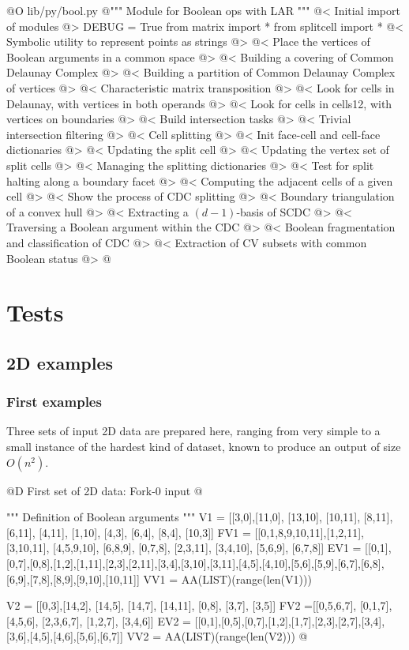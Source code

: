 \documentclass[11pt,oneside]{article}	%
\begin{document}
@O lib/py/bool.py
@{""" Module for Boolean ops with LAR """
@< Initial import of modules @>
DEBUG = True
from matrix import *
from splitcell import *
@< Symbolic utility to represent points as strings @>
@< Place the vertices of Boolean arguments in a common space @>
@< Building a covering of Common Delaunay Complex @>
@< Building a partition of Common Delaunay Complex of vertices @>
@< Characteristic matrix transposition @>
@< Look for cells in Delaunay, with vertices in both operands @>
@< Look for cells in cells12, with vertices on boundaries @>
@< Build intersection tasks @>
@< Trivial intersection filtering @>
@< Cell splitting @>
@< Init face-cell and cell-face dictionaries @>
@< Updating the split cell @>
@< Updating the vertex set  of split cells @>
@< Managing the splitting dictionaries @>
@< Test for split halting along a boundary facet @>
@< Computing the adjacent cells of a given cell @>
@< Show the process of CDC splitting @>
@< Boundary triangulation of a convex hull @>
@< Extracting a $(d-1)$-basis of SCDC @>
@< Traversing a Boolean argument within the CDC @>
@< Boolean fragmentation and classification of CDC @>
@< Extraction of CV subsets with common Boolean status @>
@}

\section{Tests}



\subsection{2D examples}

\subsubsection{First examples}

Three sets of input 2D data are prepared here, ranging from very simple to a small instance of the hardest kind of dataset, known to produce an output of size $O(n^2)$.


@D First set of 2D data: Fork-0 input
@{""" Definition of Boolean arguments """
V1 = [[3,0],[11,0], [13,10], [10,11], [8,11], [6,11], [4,11], [1,10], [4,3], [6,4], 
	[8,4], [10,3]]
FV1 = [[0,1,8,9,10,11],[1,2,11], [3,10,11], [4,5,9,10], [6,8,9], [0,7,8], [2,3,11],
	[3,4,10], [5,6,9], [6,7,8]]
EV1 = [[0,1],[0,7],[0,8],[1,2],[1,11],[2,3],[2,11],[3,4],[3,10],[3,11],[4,5],[4,10],[5,6],[5,9],[6,7],[6,8],[6,9],[7,8],[8,9],[9,10],[10,11]]
VV1 = AA(LIST)(range(len(V1)))

V2 = [[0,3],[14,2], [14,5], [14,7], [14,11], [0,8], [3,7], [3,5]]
FV2 =[[0,5,6,7], [0,1,7], [4,5,6], [2,3,6,7], [1,2,7], [3,4,6]]
EV2 = [[0,1],[0,5],[0,7],[1,2],[1,7],[2,3],[2,7],[3,4],[3,6],[4,5],[4,6],[5,6],[6,7]]
VV2 = AA(LIST)(range(len(V2)))
@}
\end{document}
